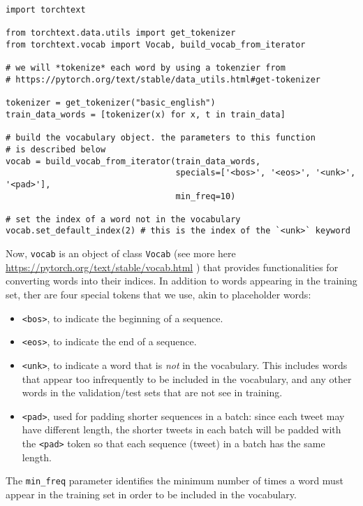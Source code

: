 \documentclass[
  letterpaper,
  DIV=11,
  numbers=noendperiod]{scrartcl}
\providecommand{\tightlist}{%
  \setlength{\itemsep}{0pt}\setlength{\parskip}{0pt}}
\begin{document}
\begin{verbatim}
import torchtext

from torchtext.data.utils import get_tokenizer
from torchtext.vocab import Vocab, build_vocab_from_iterator

# we will *tokenize* each word by using a tokenzier from 
# https://pytorch.org/text/stable/data_utils.html#get-tokenizer

tokenizer = get_tokenizer("basic_english")
train_data_words = [tokenizer(x) for x, t in train_data]

# build the vocabulary object. the parameters to this function
# is described below
vocab = build_vocab_from_iterator(train_data_words,
                                  specials=['<bos>', '<eos>', '<unk>', '<pad>'],
                                  min_freq=10)

# set the index of a word not in the vocabulary
vocab.set_default_index(2) # this is the index of the `<unk>` keyword
\end{verbatim}

Now, \texttt{vocab} is an object of class \texttt{Vocab} (see more here
\url{https://pytorch.org/text/stable/vocab.html} ) that provides
functionalities for converting words into their indices. In addition to
words appearing in the training set, ther are four special tokens that
we use, akin to placeholder words:

\begin{itemize}
\tightlist
\item
  \texttt{\textless{}bos\textgreater{}}, to indicate the beginning of a
  sequence.
\item
  \texttt{\textless{}eos\textgreater{}}, to indicate the end of a
  sequence.
\item
  \texttt{\textless{}unk\textgreater{}}, to indicate a word that is
  \emph{not} in the vocabulary. This includes words that appear too
  infrequently to be included in the vocabulary, and any other words in
  the validation/test sets that are not see in training.
\item
  \texttt{\textless{}pad\textgreater{}}, used for padding shorter
  sequences in a batch: since each tweet may have different length, the
  shorter tweets in each batch will be padded with the
  \texttt{\textless{}pad\textgreater{}} token so that each sequence
  (tweet) in a batch has the same length.
\end{itemize}

The \texttt{min\_freq} parameter identifies the minimum number of times
a word must appear in the training set in order to be included in the
vocabulary.
\end{document}
